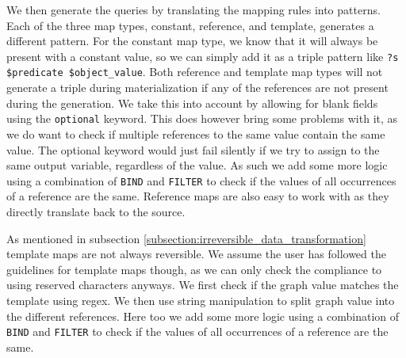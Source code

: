 We then generate the queries by translating the mapping rules into patterns. 
Each of the three map types, constant, reference, and template, generates a different pattern.
For the constant map type, we know that it will always be present with a constant value, so we can simply add it as a triple pattern like \texttt{?s \$predicate \$object\_value}. 
Both reference and template map types will not generate a triple during materialization if any of the references are not present during the generation. We take this into account by allowing for blank fields using the \texttt{optional} keyword. This does however bring some problems with it, as we do want to check if multiple references to the same value contain the same value. The optional keyword would just fail silently if we try to assign to the same output variable, regardless of the value. As such we add some more logic using a combination of \texttt{BIND} and \texttt{FILTER} to check if the values of all occurrences of a reference are the same.
Reference maps are also easy to work with as they directly translate back to the source. 




As mentioned in subsection \ref{subsection:irreversible_data_transformation} template maps are not always reversible. We assume the user has followed the guidelines for template maps though, as we can only check the compliance to using reserved characters anyways. We first check if the graph value matches the template using regex. We then use string manipulation to split graph value into the different references. Here too we add some more logic using a combination of \texttt{BIND} and \texttt{FILTER} to check if the values of all occurrences of a reference are the same.


